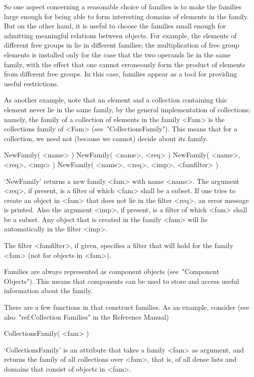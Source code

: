 So one aspect concerning a reasonable choice of families is
to make the families large enough for being able to form interesting
domains of elements in the family.
But on the other hand,
it is useful to choose the families small enough for admitting
meaningful relations between objects.
For example, the elements of different free groups in {\GAP}
lie in different families;
the multiplication of free group elements is installed only for the
case that the two operands lie in the same family,
with the effect that one cannot erroneously form the product of
elements from different free groups.
In this case, families appear as a tool for providing useful
restrictions.

As another example, note that an element and a collection containing
this element never lie in the same family,
by the general implementation of collections;
namely, the family of a collection of elements in the family <Fam>
is the collections family of <Fam> (see~"CollectionsFamily").
This means that for a collection, we need not (because we cannot)
decide about its family.


\>NewFamily( <name> )
\)NewFamily( <name>, <req> )
\)NewFamily( <name>, <req>, <imp> )
\)NewFamily( <name>, <req>, <imp>, <famfilter> )

`NewFamily' returns a new family <fam> with name <name>.
The argument <req>, if present, is a filter of which <fam> shall be a
subset.
If one tries to create an object in <fam> that does not lie in the filter
<req>, an error message is printed.
Also the argument <imp>, if present,
is a filter of which <fam> shall be a subset.
Any object that is created in the family <fam> will lie automatically in
the filter <imp>.

The filter <famfilter>, if given, specifies a filter that will hold for the
family <fam> (not for objects in <fam>).

Families are always represented as component objects
(see~"Component Objects").
This means that components can be used to store and access
useful information about the family.

There are a few functions in {\GAP} that construct families.
As an example, consider
(see also~"ref:Collection Families" in the Reference Manual)

\>CollectionsFamily( <fam> )

`CollectionsFamily' is an attribute that takes a family <fam> as
argument, and returns the family of all collections over <fam>,
that is, of all dense lists and domains that consist of objects in
<fam>.

